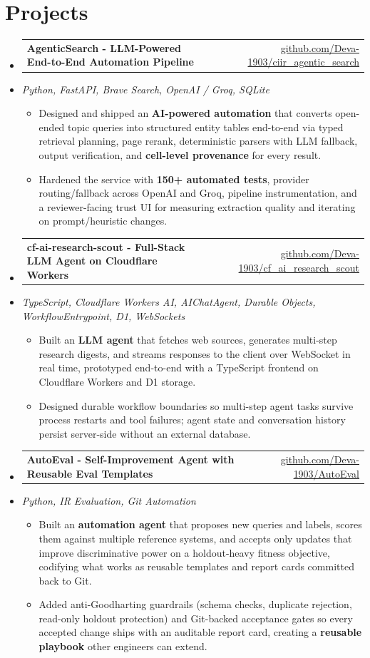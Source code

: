 \documentclass[letterpaper,10pt]{article}
\makeatletter
\newcommand{\resumeItem}[1]{
  \item\small{#1\vspace{-1pt}}
}
\newcommand{\resumeProjectHeading}[2]{
    \item
    \begin{tabular*}{0.985\textwidth}[t]{l@{\extracolsep{\fill}}r}
      \small\textbf{#1} & \small #2 \\
    \end{tabular*}\vspace{-5pt}
}
\newcommand{\resumeProjectSubheading}[1]{
  \vspace{-2pt}\item[] {\small\textcolor{ResumeSlate}{\emph{#1}}}\vspace{-3pt}
}
\newcommand{\resumeSubHeadingListStart}{\begin{itemize}[leftmargin=0.0in, label={}, itemsep=2pt, topsep=2pt]}
\newcommand{\resumeSubHeadingListEnd}{\end{itemize}}
\newcommand{\resumeItemListStart}{\begin{itemize}[leftmargin=0.18in, itemsep=2pt, topsep=1pt]}
\newcommand{\resumeItemListEnd}{\end{itemize}\vspace{-4pt}}
\makeatother
\begin{document}
\section{Projects}
\resumeSubHeadingListStart
  \resumeProjectHeading
    {AgenticSearch - LLM-Powered End-to-End Automation Pipeline}
    {\href{https://github.com/Deva-1903/ciir_agentic_search}{github.com/Deva-1903/ciir\_agentic\_search}}
  \resumeProjectSubheading{Python, FastAPI, Brave Search, OpenAI / Groq, SQLite}
    \resumeItemListStart
      \resumeItem{Designed and shipped an \textbf{AI-powered automation} that converts open-ended topic queries into structured entity tables end-to-end via typed retrieval planning, page rerank, deterministic parsers with LLM fallback, output verification, and \textbf{cell-level provenance} for every result.}
      \resumeItem{Hardened the service with \textbf{150+ automated tests}, provider routing/fallback across OpenAI and Groq, pipeline instrumentation, and a reviewer-facing trust UI for measuring extraction quality and iterating on prompt/heuristic changes.}
    \resumeItemListEnd
  \resumeProjectHeading
    {cf-ai-research-scout - Full-Stack LLM Agent on Cloudflare Workers}
    {\href{https://github.com/Deva-1903/cf_ai_research_scout}{github.com/Deva-1903/cf\_ai\_research\_scout}}
  \resumeProjectSubheading{TypeScript, Cloudflare Workers AI, AIChatAgent, Durable Objects, WorkflowEntrypoint, D1, WebSockets}
    \resumeItemListStart
      \resumeItem{Built an \textbf{LLM agent} that fetches web sources, generates multi-step research digests, and streams responses to the client over WebSocket in real time, prototyped end-to-end with a TypeScript frontend on Cloudflare Workers and D1 storage.}
      \resumeItem{Designed durable workflow boundaries so multi-step agent tasks survive process restarts and tool failures; agent state and conversation history persist server-side without an external database.}
    \resumeItemListEnd
  \resumeProjectHeading
    {AutoEval - Self-Improvement Agent with Reusable Eval Templates}
    {\href{https://github.com/Deva-1903/AutoEval}{github.com/Deva-1903/AutoEval}}
  \resumeProjectSubheading{Python, IR Evaluation, Git Automation}
    \resumeItemListStart
      \resumeItem{Built an \textbf{automation agent} that proposes new queries and labels, scores them against multiple reference systems, and accepts only updates that improve discriminative power on a holdout-heavy fitness objective, codifying what works as reusable templates and report cards committed back to Git.}
      \resumeItem{Added anti-Goodharting guardrails (schema checks, duplicate rejection, read-only holdout protection) and Git-backed acceptance gates so every accepted change ships with an auditable report card, creating a \textbf{reusable playbook} other engineers can extend.}
    \resumeItemListEnd
\resumeSubHeadingListEnd
\vspace{-4pt}
\end{document}
